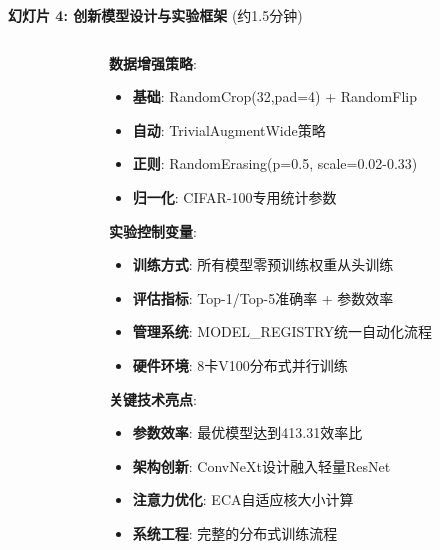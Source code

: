\documentclass[10pt]{beamer}
\begin{document}
\begin{frame}{\textbf{幻灯片 4: 创新模型设计与实验框架} (约1.5分钟)}
{\begin{columns}[T]
\begin{column}{0.48\textwidth}
    \end{column}
    \begin{column}{0.48\textwidth}
        \textbf{数据增强策略}:
        \begin{itemize}
            \item \textbf{基础}: RandomCrop(32,pad=4) + RandomFlip
            \item \textbf{自动}: TrivialAugmentWide策略
            \item \textbf{正则}: RandomErasing(p=0.5, scale=0.02-0.33)
            \item \textbf{归一化}: CIFAR-100专用统计参数
        \end{itemize}
        
        \textbf{实验控制变量}:
        \begin{itemize}
            \item \textbf{训练方式}: 所有模型零预训练权重从头训练
            \item \textbf{评估指标}: Top-1/Top-5准确率 + 参数效率
            \item \textbf{管理系统}: MODEL\_REGISTRY统一自动化流程
            \item \textbf{硬件环境}: 8卡V100分布式并行训练
        \end{itemize}
        
        \textbf{关键技术亮点}:
        \begin{itemize}
            \item \textbf{参数效率}: 最优模型达到413.31效率比
            \item \textbf{架构创新}: ConvNeXt设计融入轻量ResNet
            \item \textbf{注意力优化}: ECA自适应核大小计算
            \item \textbf{系统工程}: 完整的分布式训练流程
        \end{itemize}
    

    \end{column}
\end{columns}
}

\end{frame}
\end{document}
